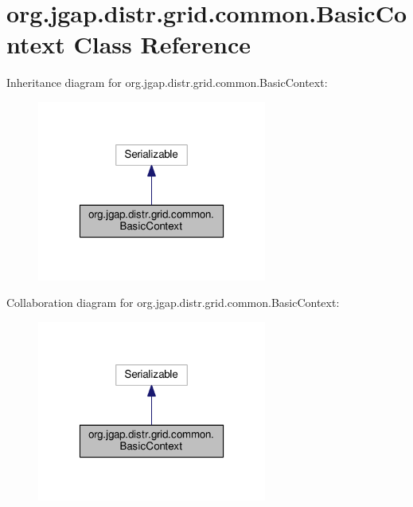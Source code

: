 \hypertarget{classorg_1_1jgap_1_1distr_1_1grid_1_1common_1_1_basic_context}{\section{org.\-jgap.\-distr.\-grid.\-common.\-Basic\-Context Class Reference}
\label{classorg_1_1jgap_1_1distr_1_1grid_1_1common_1_1_basic_context}
}


Inheritance diagram for org.\-jgap.\-distr.\-grid.\-common.\-Basic\-Context\-:
\nopagebreak
\begin{figure}[H]
\begin{center}
\leavevmode
\includegraphics[width=214pt]{classorg_1_1jgap_1_1distr_1_1grid_1_1common_1_1_basic_context__inherit__graph}
\end{center}
\end{figure}


Collaboration diagram for org.\-jgap.\-distr.\-grid.\-common.\-Basic\-Context\-:
\nopagebreak
\begin{figure}[H]
\begin{center}
\leavevmode
\includegraphics[width=214pt]{classorg_1_1jgap_1_1distr_1_1grid_1_1common_1_1_basic_context__coll__graph}
\end{center}
\end{figure}
